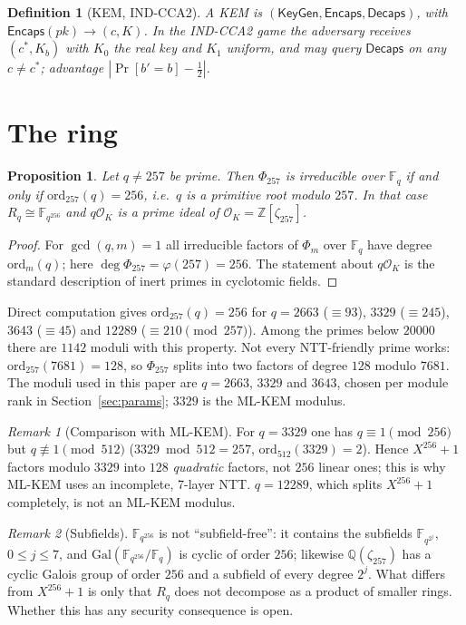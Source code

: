 \documentclass[11pt]{article}
\newtheorem{proposition}{Proposition}
\newtheorem{definition}{Definition}
\theoremstyle{remark}
\newtheorem{remark}{Remark}
\newcommand{\Z}{\mathbb{Z}}
\newcommand{\F}{\mathbb{F}}
\newcommand{\Rq}{R_q}
\begin{document}
\begin{definition}[KEM, IND-CCA2]
A KEM is $(\mathsf{KeyGen},\mathsf{Encaps},\mathsf{Decaps})$, with $\mathsf{Encaps}(pk)\to(c,K)$. In the IND-CCA2 game the adversary receives $(c^*,K_b)$ with $K_0$ the real key and $K_1$ uniform, and may query $\mathsf{Decaps}$ on any $c\neq c^*$; advantage $|\Pr[b'=b]-\tfrac12|$.
\end{definition}

\section{The ring}\label{sec:ring}
\begin{proposition}\label{prop:irr}
Let $q\ne257$ be prime. Then $\Phi_{257}$ is irreducible over $\F_q$ if and only if $\mathrm{ord}_{257}(q)=256$, i.e.\ $q$ is a primitive root modulo $257$. In that case $\Rq\cong\F_{q^{256}}$ and $q\mathcal{O}_K$ is a prime ideal of $\mathcal{O}_K=\Z[\zeta_{257}]$.
\end{proposition}
\begin{proof}
For $\gcd(q,m)=1$ all irreducible factors of $\Phi_m$ over $\F_q$ have degree $\mathrm{ord}_m(q)$; here $\deg\Phi_{257}=\varphi(257)=256$. The statement about $q\mathcal O_K$ is the standard description of inert primes in cyclotomic fields.
\end{proof}
Direct computation gives $\mathrm{ord}_{257}(q)=256$ for $q=2663$ ($\equiv93$), $3329$ ($\equiv245$), $3643$ ($\equiv45$) and $12289$ ($\equiv210 \pmod{257}$). Among the primes below $20000$ there are $1142$ moduli with this property. Not every NTT-friendly prime works: $\mathrm{ord}_{257}(7681)=128$, so $\Phi_{257}$ splits into two factors of degree $128$ modulo $7681$. The moduli used in this paper are $q=2663$, $3329$ and $3643$, chosen per module rank in Section~\ref{sec:params}; $3329$ is the ML-KEM modulus.

\begin{remark}[Comparison with ML-KEM]
For $q=3329$ one has $q\equiv 1 \pmod{256}$ but $q\not\equiv 1\pmod{512}$ ($3329\bmod 512=257$, $\mathrm{ord}_{512}(3329)=2$). Hence $X^{256}+1$ factors modulo $3329$ into $128$ \emph{quadratic} factors, not $256$ linear ones; this is why ML-KEM uses an incomplete, 7-layer NTT. $q=12289$, which splits $X^{256}+1$ completely, is not an ML-KEM modulus.
\end{remark}

\begin{remark}[Subfields]\label{rem:sub}
$\F_{q^{256}}$ is not ``subfield-free'': it contains the subfields $\F_{q^{2^j}}$, $0\le j\le 7$, and $\mathrm{Gal}(\F_{q^{256}}/\F_q)$ is cyclic of order $256$; likewise $\mathbb{Q}(\zeta_{257})$ has a cyclic Galois group of order $256$ and a subfield of every degree $2^j$. What differs from $X^{256}+1$ is only that $\Rq$ does not decompose as a product of smaller rings. Whether this has any security consequence is open.
\end{remark}
\end{document}
